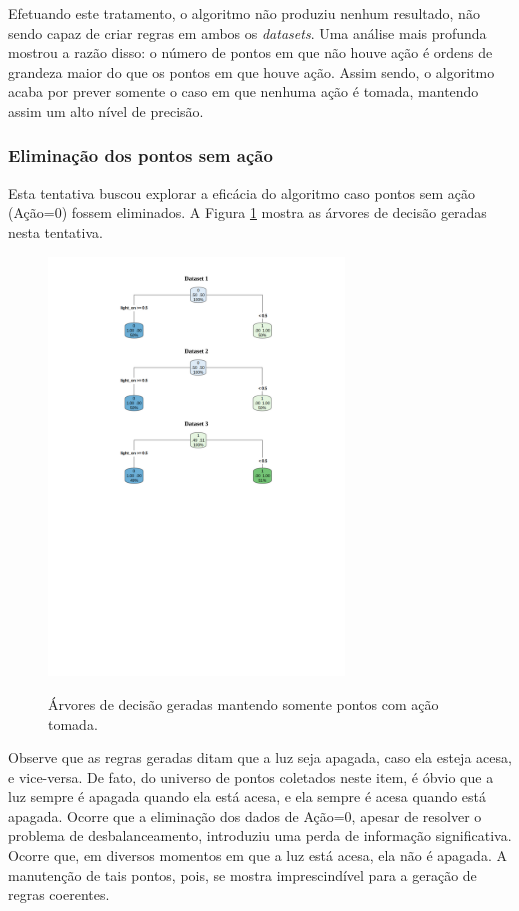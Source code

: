 Efetuando este tratamento, o algoritmo não produziu nenhum resultado, não sendo capaz de criar regras em ambos os \textit{datasets}. Uma análise mais profunda mostrou a razão disso: o número de pontos em que não houve ação é ordens de grandeza maior do que os pontos em que houve ação. Assim sendo, o algoritmo acaba por prever somente o caso em que nenhuma ação é tomada, mantendo assim um alto nível de precisão. 

\subsubsection{Eliminação dos pontos sem ação} \label{subsubsec:elim_pts_sem_acao}
Esta tentativa buscou explorar a eficácia do algoritmo caso pontos sem ação (Ação=0) fossem eliminados. A Figura \ref{fig:teste_3} mostra as árvores de decisão geradas nesta tentativa.

\begin{figure}[hp]
	\centering
	\caption{Árvores de decisão geradas mantendo somente pontos com ação tomada.}
  \includegraphics[width=0.7\textwidth]{imagens/teste_learning/3.pdf}
  \label{fig:teste_3}  
\end{figure}

Observe que as regras geradas ditam que a luz seja apagada, caso ela esteja acesa, e vice-versa. De fato, do universo de pontos coletados neste item, é óbvio que a luz sempre é apagada quando ela está acesa, e ela sempre é acesa quando está apagada. Ocorre que a eliminação dos dados de Ação=0, apesar de resolver o problema de desbalanceamento, introduziu uma perda de informação significativa. Ocorre que, em diversos momentos em que a luz está acesa, ela não é apagada. A manutenção de tais pontos, pois, se mostra imprescindível para a geração de regras coerentes.

